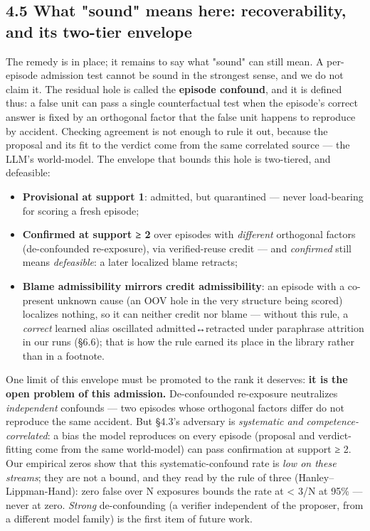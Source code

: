 \documentclass[11pt]{article}
\begin{document}
\subsection*{4.5 What "sound" means here: recoverability, and its two-tier envelope}

The remedy is in place; it remains to say what "sound" can still mean. A per-episode admission test cannot be sound in the strongest sense, and we do not claim it. The residual hole is called the \textbf{episode confound}, and it is defined thus: a false unit can pass a single counterfactual test when the episode's correct answer is fixed by an orthogonal factor that the false unit happens to reproduce by accident. Checking agreement is not enough to rule it out, because the proposal and its fit to the verdict come from the same correlated source — the LLM's world-model. The envelope that bounds this hole is two-tiered, and defeasible:

\begin{itemize}
\item \textbf{Provisional at support 1}: admitted, but quarantined — never load-bearing for scoring a fresh episode;
\item \textbf{Confirmed at support ≥ 2} over episodes with \emph{different} orthogonal factors (de-confounded re-exposure), via verified-reuse credit — and \emph{confirmed} still means \emph{defeasible}: a later localized blame retracts;
\item \textbf{Blame admissibility mirrors credit admissibility}: an episode with a co-present unknown cause (an OOV hole in the very structure being scored) localizes nothing, so it can neither credit nor blame — without this rule, a \emph{correct} learned alias oscillated admitted↔retracted under paraphrase attrition in our runs (§6.6); that is how the rule earned its place in the library rather than in a footnote.
\end{itemize}

One limit of this envelope must be promoted to the rank it deserves: \textbf{it is the open problem of this admission.} De-confounded re-exposure neutralizes \emph{independent} confounds — two episodes whose orthogonal factors differ do not reproduce the same accident. But §4.3's adversary is \emph{systematic and competence-correlated}: a bias the model reproduces on every episode (proposal and verdict-fitting come from the same world-model) can pass confirmation at support ≥ 2. Our empirical zeros show that this systematic-confound rate is \emph{low on these streams}; they are not a bound, and they read by the rule of three (Hanley–Lippman-Hand): zero false over N exposures bounds the rate at < 3/N at 95\% — never at zero. \emph{Strong} de-confounding (a verifier independent of the proposer, from a different model family) is the first item of future work.
\end{document}
